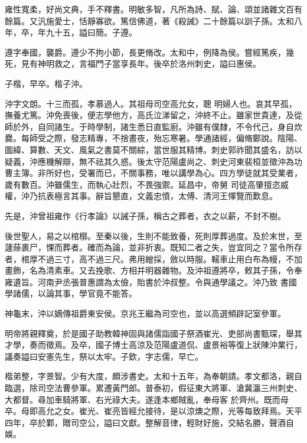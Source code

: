 \begin{pinyinscope}
 雍性寬柔，好尚文典，手不釋書。明敏多智，凡所為詩、賦、論、頌並諸雜文百有餘篇。又汎施愛士，恬靜寡欲。篤信佛道，著《殺誡》二十餘篇以訓子孫。太和八年，卒，年九十五，謚曰簡。子遵。



 遵字奉國，襲爵。遵少不拘小節，長更脩改。太和中，例降為侯。嘗經篤疾，幾死，見有神明救之，言福門子當享長年。後卒於洛州刺史，謚曰惠侯。



 子楷，早卒。楷子沖。



 沖字文朗。十三而孤，孝慕過人。其祖母司空高允女，聰
 明婦人也。哀其早孤，撫養尤篤。沖免喪後，便志學他方，高氏泣涕留之，沖終不止。雖家世貴達，及從師於外，自同諸生。于時學制，諸生悉日直監廚。沖雖有僕隸，不令代己，身自炊爨。每師受之際，發志精專，不捨晝夜，殆忘寒暑。學通諸經，偏脩鄭說。陰陽、圖緯、算數、天文、風氣之書莫不關綜，當世服其精博。刺史郭祚聞其盛名，訪以疑義，沖應機解辯，無不祛其久惑。後太守范陽盧尚之、刺史河東裴桓並徵沖為功曹主簿。非所好也，受署而已，不關事務，唯以講學為心。四方學徒就其受業者，歲有數百。沖雖儒生，而執心壯烈，不畏強禦。延昌中，帝舅
 司徒高肇擅恣威權，沖乃抗表極言其事。辭旨懇直，文義忠憤，太傅、清河王懌覽而歎息。



 先是，沖曾祖雍作《行孝論》以誡子孫，稱古之葬者，衣之以薪，不封不樹。



 後世聖人，易之以棺槨。至秦以後，生則不能致養，死則厚葬過度。及於末世，至蘧蒢裹尸，惈而葬者。確而為論，並非折衷。既知二者之失，豈宜同之？當令所存者，棺厚不過三寸，高不過三尺。弗用繒採，斂以時服。轜車止用白布為幔，不加畫飾，名為清素車。又去挽歌、方相并明器雜物。及沖祖遵將卒，敕其子孫，令奉雍遺旨。河南尹丞張普惠謂為太儉，貽書於沖叔整。令與通學議之。沖乃致
 書國學諸儒，以論其事，學官竟不能答。



 神龜末，沖以嫡傳祖爵東安侯。京兆王繼為司空也，並以高選頻辟記室參軍。



 明帝將親釋奠，於是國子助教韓神固與諸儒詣國子祭酒崔光、吏部尚書甄琛，舉其才學，奏而徵焉。及卒，國子博士高涼及范陽盧道侃、盧景裕等復上狀陳沖業行，議奏謚曰安憲先生，祭以太牢。子欽，字志儒，早亡。



 楷弟整，字景智。少有大度，頗涉書史。太和十五年，為奉朝請。孝文都洛，親自臨選，除司空法曹參軍。累遷黃門郎。普泰初，假征東大將軍、滄冀瀛三州刺史、大都督。尋加車騎將軍、右光祿大夫。遂逢本鄉賊亂，奉母客
 於齊州。既而母卒。母即高允之女。崔光、崔亮皆經允接待，是以涼燠之際，光等每致拜焉。天平四年，卒於鄴，贈司空公，謚曰文獻。整解音律，輕財好施，交結名勝，聲酒自娛。




\end{pinyinscope}

